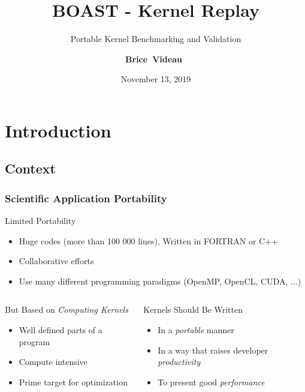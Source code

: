 \documentclass{beamer}
\title{BOAST - Kernel Replay}
\subtitle{Portable Kernel Benchmarking and Validation}
\author[B. V.]{\textbf{Brice~Videau}~\inst{1}}
\institute[ANL]{\inst{1} Argonne National Laboratory}
\date{November 13, 2019}
\begin{document}
\frame{\titlepage}

\section{Introduction}

\subsection{Context}

\begin{frame}
  \frametitle{Scientific Application Portability}

  \begin{block}{\footnotesize Limited Portability}
    \begin{itemize}
      \item \scriptsize Huge codes (more than 100 000 lines), Written in FORTRAN or C++
      \item \scriptsize Collaborative efforts
      \item \scriptsize Use many different programming paradigms (OpenMP, OpenCL, CUDA, ...)
    \end{itemize}
  \end{block}

  \begin{columns}

  \begin{block}{\footnotesize But Based on \emph{Computing Kernels}}
    \begin{itemize}
      \item \scriptsize Well defined parts of a program
      \item \scriptsize Compute intensive
      \item \scriptsize Prime target for optimization
    \end{itemize}
  \end{block}

  \begin{block}{\footnotesize Kernels Should Be Written}
    \begin{itemize}
      \item \scriptsize In a \emph{portable} manner
      \item \scriptsize In a way that raises developer \emph{productivity}
      \item \scriptsize To present good \emph{performance}
    \end{itemize}
  \end{block}

  \end{columns}

\end{frame}
\end{document}
